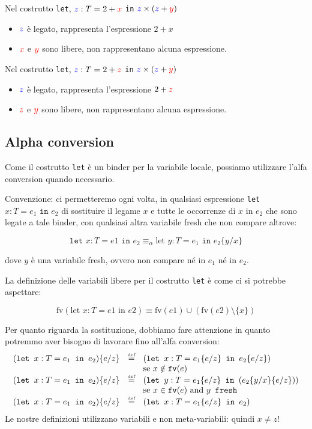 Nel costrutto \texttt{let}, $\textcolor{blue}{z}:T = 2+\textcolor{red}{x}$ \texttt{in} $\textcolor{blue}{z} \times
(\textcolor{blue}{z}+\textcolor{red}{y})$
\begin{itemize}
    \item $\textcolor{blue}{z}$ è legato, rappresenta l'espressione $2+x$
    \item $\textcolor{red}{x}$ e $\textcolor{red}{y}$ sono libere, non rappresentano alcuna espressione.
\end{itemize}

Nel costrutto \texttt{let}, $\textcolor{blue}{z}:T = 2+\textcolor{red}{z}$ \texttt{in} $\textcolor{blue}{z} \times
(\textcolor{blue}{z}+\textcolor{red}{y})$
\begin{itemize}
    \item $\textcolor{blue}{z}$ è legato, rappresenta l'espressione $2+\textcolor{red}{z}$
    \item $\textcolor{red}{z}$ e $\textcolor{red}{y}$ sono libere, non rappresentano alcuna espressione.
\end{itemize}
\subsection{Alpha conversion}
Come il costrutto \texttt{let} è un binder per la variabile locale, possiamo utilizzare
l'alfa conversion quando necessario. 

Convenzione: ci permetteremo ogni volta, in qualsiasi espressione
\texttt{let} $x:T=e_1 \texttt{ in } e_2$ di sostituire il legame $x$ e tutte le
occorrenze di $x$ in $e_2$ che sono legate a tale binder, con qualsiasi altra variabile
fresh che non compare altrove: 

\[
    \texttt{let } x:T=e1 \texttt{ in } e_2 \equiv_\alpha \text{let } y:T=e_1 \texttt{ in } e_2\{y/x\}
\]

dove $y$ è una variabile fresh, ovvero non compare né in $e_1$ né in $e_2$.

La definizione delle variabili libere per il costrutto \texttt{let} è come ci si potrebbe aspettare:

\[
    \text{fv}(\text{let } x:T=e1 \text{ in } e2) \equiv \text{fv}(e1) \cup (\text{fv}(e2) \setminus \{x\})
\]

Per quanto riguarda la sostituzione, dobbiamo fare attenzione in quanto potremmo
aver bisogno di lavorare fino all'alfa conversion:
\[
\begin{array}{lll}
(\texttt{let } x:T=e_1 \texttt{ in } e_2)\{e/z\} & \defeq & 
(\texttt{let } x:T=e_1\{e/z\} \texttt{ in } e_2\{e/z\}) \\
& & \text{se }x \notin \texttt{fv}(e)\\
(\texttt{let } x:T=e_1 \texttt{ in } e_2)\{e/z\} & \defeq & 
(\texttt{let } y:T=e_1\{e/z\} \texttt{ in } (e_2\{y/x\}\{e/z\}))  \\
& &  \text{se }x \in \texttt{fv}(e) \text{ and } y \texttt{ fresh}\\
(\texttt{let } x:T=e_1 \texttt{ in } e_2)\{e/z\} & \defeq & 
(\texttt{let } x:T=e_1\{e/z\} \texttt{ in } e_2)\\
\end{array}
\]
Le nostre definizioni utilizzano variabili e non meta-variabili: quindi $x\not=z$!
